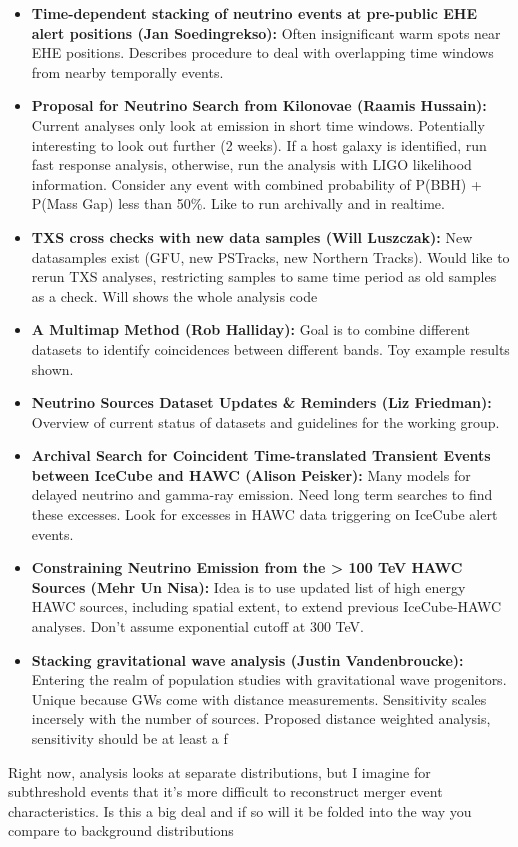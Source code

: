 \begin{itemize}
    \item \textbf{Time-dependent stacking of neutrino events at pre-public EHE alert positions (Jan Soedingrekso):} Often insignificant warm spots near EHE positions. Describes procedure to deal with overlapping time windows from nearby temporally events.
    \item \textbf{Proposal for Neutrino Search from Kilonovae (Raamis Hussain):} Current analyses only look at emission in short time windows. Potentially interesting to look out further (2 weeks). If a host galaxy is identified, run fast response analysis, otherwise, run the analysis with LIGO likelihood information. Consider any event with combined probability of P(BBH) + P(Mass Gap) less than 50\%. Like to run archivally and in realtime. 
    \item \textbf{TXS cross checks with new data samples (Will Luszczak):} New datasamples exist (GFU, new PSTracks, new Northern Tracks). Would like to rerun TXS analyses, restricting samples to same time period as old samples as a check. Will shows the whole analysis code
    \item \textbf{A Multimap Method (Rob Halliday):} Goal is to combine different datasets to identify coincidences between different bands. Toy example results shown. 
    \item \textbf{Neutrino Sources Dataset Updates & Reminders (Liz Friedman):} Overview of current status of datasets and guidelines for the working group. 
    \item \textbf{Archival Search for Coincident Time-translated Transient Events between IceCube and HAWC (Alison Peisker):} Many models for delayed neutrino and gamma-ray emission. Need long term searches to find these excesses. Look for excesses in HAWC data triggering on IceCube alert events.
    \item \textbf{Constraining Neutrino Emission from the > 100 TeV HAWC Sources (Mehr Un Nisa):} Idea is to use updated list of high energy HAWC sources, including spatial extent, to extend previous IceCube-HAWC analyses. Don't assume exponential cutoff at 300 TeV.
    \item \textbf{Stacking gravitational wave analysis (Justin Vandenbroucke):} Entering the realm of population studies with gravitational wave progenitors. Unique because GWs come with distance measurements. Sensitivity scales incersely with the number of sources. Proposed distance weighted analysis, sensitivity should be at least a f
\end{itemize}

Right now, analysis looks at separate distributions, but I imagine for subthreshold events that it's more difficult to reconstruct merger event characteristics. Is this a big deal and if so will it be folded into the way you compare to background distributions